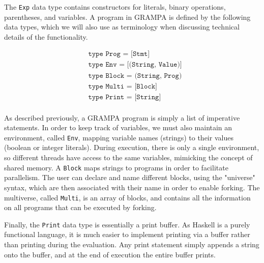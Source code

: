 \documentclass[numbers]{sigplanconf}
\begin{document}
The \texttt{Exp} data type contains constructors for literals, binary operations, parentheses, and variables. A program in GRAMPA is defined by the following data types, which we will also use as terminology when discussing technical details of the functionality.

\begin{align*}
	&\texttt{type Prog = [Stmt]} \\
	&\texttt{type Env = [(String, Value)]} \\
	&\texttt{type Block = (String, Prog)} \\
	&\texttt{type Multi = [Block]} \\
	&\texttt{type Print = [String]} \\
\end{align*}

As described previously, a GRAMPA program is simply a list of imperative statements. In order to keep track of variables, we must also maintain an environment, called \texttt{Env}, mapping variable names (strings) to their values (boolean or integer literals). During execution, there is only a single environment, so different threads have access to the same variables, mimicking the concept of shared memory. A \texttt{Block} maps strings to programs in order to facilitate parallelism. The user can declare and name different blocks, using the "universe" syntax, which are then associated with their name in order to enable forking. The multiverse, called \texttt{Multi}, is an array of blocks, and contains all the information on all programs that can be executed by forking. 

Finally, the \texttt{Print} data type is essentially a print buffer. As Haskell is a purely functional language, it is much easier to implement printing via a buffer rather than printing during the evaluation. Any print statement simply appends a string onto the buffer, and at the end of execution the entire buffer prints.
\end{document}
